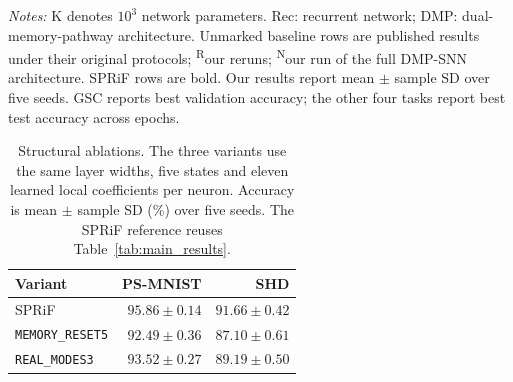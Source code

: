 \documentclass[letterpaper,journal]{IEEEtran}
\newcommand{\mr}{\textnormal{\texttt{MEMORY\_RESET5}}}
\newcommand{\rmodes}{\textnormal{\texttt{REAL\_MODES3}}}
\begin{document}
\begin{table}[!t]
\vspace{4pt}
\begin{minipage}{\textwidth}
\footnotesize
\textit{Notes:} K denotes $10^3$ network parameters. Rec: recurrent network; DMP: dual-memory-pathway architecture. Unmarked baseline rows are published results under their original protocols; \textsuperscript{R}our reruns; \textsuperscript{N}our run of the full DMP-SNN architecture. SPRiF rows are bold. Our results report mean $\pm$ sample SD over five seeds. GSC reports best validation accuracy; the other four tasks report best test accuracy across epochs.
\end{minipage}
\endgroup
\end{table}

\begin{table}[t]
\caption{Structural ablations. The three variants use the same layer widths, five states and eleven learned local coefficients per neuron. Accuracy is mean $\pm$ sample SD (\%) over five seeds. The SPRiF reference reuses Table~\ref{tab:main_results}.}
\label{tab:ablation}
\centering\footnotesize
\begin{tabular}{@{}lrr@{}}
\toprule
Variant & PS-MNIST & SHD\\
\midrule
SPRiF & $95.86\pm0.14$ & $91.66\pm0.42$\\
\mr & $92.49\pm0.36$ & $87.10\pm0.61$\\
\rmodes & $93.52\pm0.27$ & $89.19\pm0.50$\\
\bottomrule
\end{tabular}
\end{table}
\end{document}
